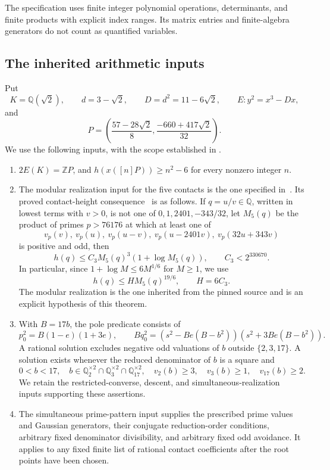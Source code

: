 \documentclass[11pt,a4paper]{article}
\newcommand{\Q}{\mathbb Q}\newcommand{\Z}{\mathbb Z}
\begin{document}
The specification uses finite integer polynomial operations,
determinants, and finite products with explicit index ranges. Its
matrix entries and finite-algebra generators do not count as
quantified variables.

\subsection{The inherited arithmetic inputs}\label{sec:inputs}

Put
\[
 K=\Q(\sqrt2),\qquad d=3-\sqrt2,\qquad D=d^2=11-6\sqrt2,
 \qquad E:y^2=x^3-Dx,
\]
and
\[
 P=\left(\frac{57-28\sqrt2}{8},
          \frac{-660+417\sqrt2}{32}\right).
\]
We use the following inputs, with the scope established in
\cite{Dependencies}.
\begin{enumerate}
\item $2E(K)=\Z P$, and $h(x([n]P))\ge n^2-6$ for every
nonzero integer $n$.
\item The modular realization input for the five contacts is the
one specified in~\cite{Evaluation}. Its proved contact-height
consequence~\cite{Nebentypus} is as follows. If $q=u/v\in\Q$,
written in lowest terms with $v>0$, is
not one of $0,1,2401,-343/32$, let $M_5(q)$ be the product of
primes $p>76176$ at which at least one of
\[
 v_p(v),\ v_p(u),\ v_p(u-v),\ v_p(u-2401v),\ v_p(32u+343v)
\]
is positive and odd, then
\[
 h(q)\le C_3M_5(q)^3(1+\log M_5(q)),\qquad C_3<2^{330670}.
\]
In particular, since $1+\log M\le6M^{1/6}$ for $M\ge1$, we use
\begin{equation}\label{eq:contact-height}
                  h(q)\le H M_5(q)^{19/6},\qquad H=6C_3.
\end{equation}
The modular realization is the one inherited from the pinned source
and is an explicit hypothesis of this theorem.
\item With $B=17b$, the pole predicate consists of
\begin{equation}\label{eq:pole}
 p_0^2=B(1-e)(1+3e),\qquad
 Bq_0^2=(s^2-Be(B-b^2))(s^2+3Be(B-b^2)).
\end{equation}
A rational solution excludes negative odd valuations of $b$ outside
$\{2,3,17\}$. A solution exists whenever the reduced denominator of
$b$ is a square and
\begin{equation}\label{eq:pole-preparation}
 0<b<17,\quad b\in\Q_2^{\times2}\cap\Q_3^{\times2}
                  \cap\Q_{17}^{\times2},\quad
 v_2(b)\ge3,\quad v_3(b)\ge1,\quad v_{17}(b)\ge2.
\end{equation}
We retain the restricted-converse, descent, and simultaneous-realization
inputs supporting these assertions.
\item The simultaneous prime-pattern input supplies the prescribed
prime values and Gaussian generators, their conjugate reduction-order
conditions, arbitrary fixed denominator divisibility, and arbitrary
fixed odd avoidance. It applies to any fixed finite list of rational
contact coefficients after the root points have been chosen.
\end{enumerate}
\end{document}
